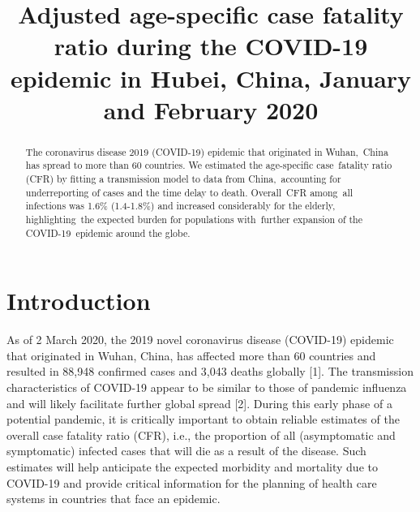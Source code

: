 \documentclass{article}
\title{Adjusted age-specific case fatality ratio during the COVID-19 epidemic in Hubei, China, January and February 2020}
\begin{document}
\maketitle

\begin{abstract}
The coronavirus disease 2019 (COVID-19) epidemic that originated in Wuhan, China has spread to more than 60 countries. We estimated the age-specific case fatality ratio (CFR) by fitting a transmission model to data from China, accounting for underreporting of cases and the time delay to death. Overall CFR among all infections was 1.6\% (1.4-1.8\%) and increased considerably for the elderly, highlighting the expected burden for populations with further expansion of the COVID-19 epidemic around the globe.
\end{abstract}

\section*{Introduction}

As of 2 March 2020, the 2019 novel coronavirus disease (COVID-19) epidemic that originated in Wuhan, China, has affected more than 60 countries and resulted in 88,948 confirmed cases and 3,043 deaths globally [1]. The transmission characteristics of COVID-19 appear to be similar to those of pandemic influenza and will likely facilitate further global spread [2]. During this early phase of a potential pandemic, it is critically important to obtain reliable estimates of the overall case fatality ratio (CFR), i.e., the proportion of all (asymptomatic and symptomatic) infected cases that will die as a result of the disease. Such estimates will help anticipate the expected morbidity and mortality due to COVID-19 and provide critical information for the planning of health care systems in countries that face an epidemic.
\end{document}
